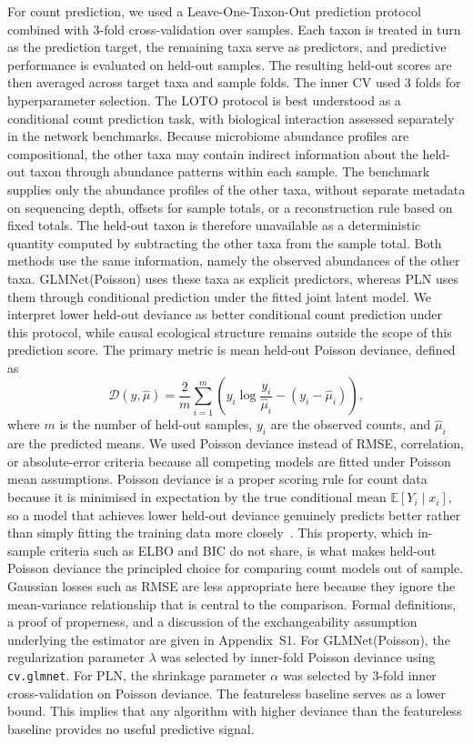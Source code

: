 \documentclass[USenglish]{article}
\theoremstyle{dgthm}
\begin{document}
For count prediction, we used a Leave-One-Taxon-Out prediction protocol combined with 3-fold cross-validation over samples.
Each taxon is treated in turn as the prediction target, the remaining taxa serve as predictors, and predictive performance is evaluated on held-out samples.
The resulting held-out scores are then averaged across target taxa and sample folds.
The inner CV used 3 folds for hyperparameter selection.
The LOTO protocol is best understood as a conditional count prediction task, with biological interaction assessed separately in the network benchmarks.
Because microbiome abundance profiles are compositional, the other taxa may contain indirect information about the held-out taxon through abundance patterns within each sample.
The benchmark supplies only the abundance profiles of the other taxa, without separate metadata on sequencing depth, offsets for sample totals, or a reconstruction rule based on fixed totals.
The held-out taxon is therefore unavailable as a deterministic quantity computed by subtracting the other taxa from the sample total.
Both methods use the same information, namely the observed abundances of the other taxa.
GLMNet(Poisson) uses these taxa as explicit predictors, whereas PLN uses them through conditional prediction under the fitted joint latent model.
We interpret lower held-out deviance as better conditional count prediction under this protocol, while causal ecological structure remains outside the scope of this prediction score.
The primary metric is mean held-out Poisson deviance, defined as
\[
  \mathcal{D}(y, \hat\mu) = \frac{2}{m}\sum_{i=1}^{m} \left( y_i \log\frac{y_i}{\hat\mu_i} - (y_i - \hat\mu_i) \right),
\]
where $m$ is the number of held-out samples, $y_i$ are the observed counts, and $\hat\mu_i$ are the predicted means.
We used Poisson deviance instead of RMSE, correlation, or absolute-error criteria because all competing models are fitted under Poisson mean assumptions.
Poisson deviance is a proper scoring rule for count data because it is minimised in expectation by the true conditional mean $\mathbb{E}[Y_i \mid x_i]$, so a model that achieves lower held-out deviance genuinely predicts better rather than simply fitting the training data more closely~\citep{Gneiting2007ProperScoring}.
This property, which in-sample criteria such as ELBO and BIC do not share, is what makes held-out Poisson deviance the principled choice for comparing count models out of sample.
Gaussian losses such as RMSE are less appropriate here because they ignore the mean-variance relationship that is central to the comparison.
Formal definitions, a proof of properness, and a discussion of the exchangeability assumption underlying the estimator are given in Appendix~S1.
For GLMNet(Poisson), the regularization parameter $\lambda$ was selected by inner-fold Poisson deviance using \texttt{cv.glmnet}.
For PLN, the shrinkage parameter $\alpha$ was selected by 3-fold inner cross-validation on Poisson deviance.
The featureless baseline serves as a lower bound. 
This implies that any algorithm with higher deviance than the featureless baseline provides no useful predictive signal.
\end{document}
